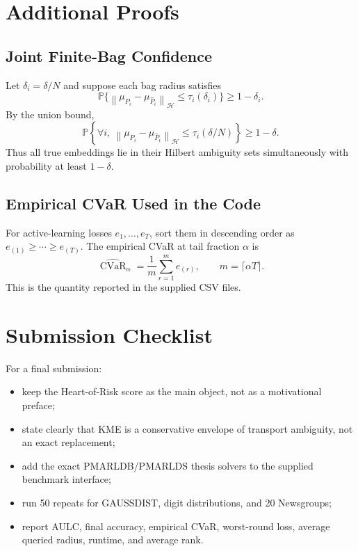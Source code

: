 \documentclass[10pt,journal]{IEEEtran}
\DeclareMathOperator{\CVaR}{CVaR}
\newcommand{\Prob}{\mathbb{P}}
\newcommand{\Hcal}{\mathcal{H}}
\newcommand{\norm}[1]{\left\lVert #1 \right\rVert}
\begin{document}
\appendices

\section{Additional Proofs}
\label{app:proofs}

\subsection{Joint Finite-Bag Confidence}

Let $\delta_i=\delta/N$ and suppose each bag radius satisfies
\begin{equation}
    \Prob\{\norm{\mu_{P_i}-\mu_{\widehat P_i}}_{\Hcal}\le \tau_i(\delta_i)\}\ge 1-\delta_i.
\end{equation}
By the union bound,
\begin{equation}
    \Prob\left\{\forall i,\ \norm{\mu_{P_i}-\mu_{\widehat P_i}}_{\Hcal}\le \tau_i(\delta/N)\right\}\ge 1-\delta.
\end{equation}
Thus all true embeddings lie in their Hilbert ambiguity sets simultaneously with probability at least $1-\delta$.

\subsection{Empirical CVaR Used in the Code}

For active-learning losses $e_1,\ldots,e_T$, sort them in descending order as $e_{(1)}\ge\cdots\ge e_{(T)}$. The empirical CVaR at tail fraction $\alpha$ is
\begin{equation}
    \widehat{\CVaR}_\alpha=\frac{1}{m}\sum_{r=1}^{m}e_{(r)},\qquad m=\lceil\alpha T\rceil.
\end{equation}
This is the quantity reported in the supplied CSV files.

\section{Submission Checklist}
\label{app:checklist}

For a final submission:
\begin{itemize}[leftmargin=1.1em]
    \item keep the Heart-of-Risk score as the main object, not as a motivational preface;
    \item state clearly that KME is a conservative envelope of transport ambiguity, not an exact replacement;
    \item add the exact PMARLDB/PMARLDS thesis solvers to the supplied benchmark interface;
    \item run 50 repeats for GAUSSDIST, digit distributions, and 20 Newsgroups;
    \item report AULC, final accuracy, empirical CVaR, worst-round loss, average queried radius, runtime, and average rank.
\end{itemize}
\end{document}
